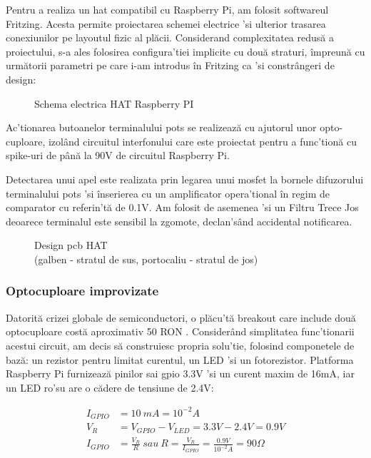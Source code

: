 Pentru a realiza un \acrfull{hat} compatibil cu Raspberry Pi, am folosit softwareul Fritzing. Acesta permite proiectarea schemei electrice 'si ulterior trasarea conexiunilor pe layoutul fizic al plăcii. Considerand complexitatea redusă a proiectului, s-a ales folosirea configura'tiei implicite cu două straturi, împreună cu următorii parametri pe care i-am introdus în Fritzing ca 'si constrângeri de design:

\begin{figure}[h!]
  \centering
  \caption{Schema electrica HAT Raspberry PI}
\end{figure}

Ac'tionarea butoanelor terminalului \acrshort{pots} se realizează cu ajutorul unor opto-cuploare, izolând circuitul interfonului care este proiectat pentru a func'tionă cu spike-uri de până la 90V de circuitul Raspberry Pi.

Detectarea unui apel este realizata prin legarea unui \acrfull{mosfet} la bornele difuzorului terminalului \acrshort{pots} 'si înserierea cu un amplificator opera'tional în regim de comparator cu referin'tă de 0.1V. Am folosit de asemenea 'si un Filtru Trece Jos deoarece terminalul este sensibil la zgomote, declan'sând accidental notificarea.

\begin{figure}[h!]
  \centering
  \caption{Design \acrshort{pcb} HAT \\(galben - stratul de sus, portocaliu - stratul de jos)}
\end{figure}

\subsubsection {Optocuploare improvizate}

Datorită crizei globale de semiconductori, o plăcu'tă breakout care include două optocuploare costă aproximativ 50 RON \cite{RoboFun2022}. Considerând simplitatea func'tionarii acestui circuit, am decis să construiesc propria solu'tie, folosind componetele de bază: un rezistor pentru limitat curentul, un LED 'si un fotorezistor. Platforma Raspberry Pi furnizează pinilor sai \acrshort{gpio} 3.3V 'si un curent maxim de 16mA, iar un LED ro'su are o cădere de tensiune de 2.4V:

\begin{equation}
\label{eq:test}
\begin{split}
I_{GPIO} & =10\ mA=10^{-2} A\\
V_{R} & =V_{GPIO} -V_{LED} =3.3V-2.4V=0.9V\\
I_{GPIO} & =\frac{V_{R}}{R} \ sau\ R=\frac{V_{R}}{I_{GPIO}} =\frac{0.9V}{10^{-2}A} =90\Omega
\end{split}
\end{equation}

